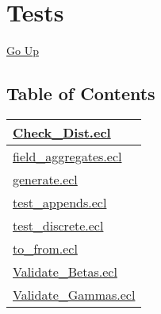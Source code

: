 \chapter*{\color{headtoc} Tests}
\hypertarget{ecldoc:toc:root/ML_Core/Tests}{}
\hyperlink{ecldoc:toc:root/ML_Core}{Go Up}


\section*{Table of Contents}
{\renewcommand{\arraystretch}{1.5}
\begin{longtable}{|p{\textwidth}|}
\hline
\hyperlink{ecldoc:toc:ML_Core.Tests.Check_Dist}{Check\_Dist.ecl} \\
\hline
\hyperlink{ecldoc:toc:ML_Core.Tests.field_aggregates}{field\_aggregates.ecl} \\
\hline
\hyperlink{ecldoc:toc:ML_Core.Tests.generate}{generate.ecl} \\
\hline
\hyperlink{ecldoc:toc:ML_Core.Tests.test_appends}{test\_appends.ecl} \\
\hline
\hyperlink{ecldoc:toc:ML_Core.Tests.test_discrete}{test\_discrete.ecl} \\
\hline
\hyperlink{ecldoc:toc:ML_Core.Tests.to_from}{to\_from.ecl} \\
\hline
\hyperlink{ecldoc:toc:ML_Core.Tests.Validate_Betas}{Validate\_Betas.ecl} \\
\hline
\hyperlink{ecldoc:toc:ML_Core.Tests.Validate_Gammas}{Validate\_Gammas.ecl} \\
\hline
\end{longtable}
}









